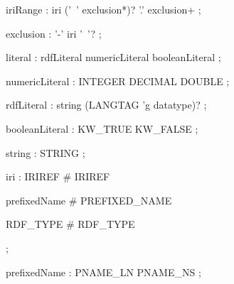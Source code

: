 \documentclass{article}
\def\bnf#1{{\scriptsize {{#1}} }}
\begin{document}
\begin{framed}
\noindent
\bnf{iriRange        : iri ('~' exclusion*)?  \textbar  '.' exclusion+ ;}
\end{framed}


\begin{framed}
\noindent
\bnf{exclusion       : '-' iri '~'? ;}
\end{framed}


\begin{framed}
\noindent
\bnf{literal         : rdfLiteral \textbar  numericLiteral \textbar  booleanLiteral ;}
\end{framed}


\begin{framed}
\noindent
\bnf{numericLiteral  : INTEGER \textbar  DECIMAL \textbar  DOUBLE ;}
\end{framed}


\begin{framed}
\noindent
\bnf{rdfLiteral      : string (LANGTAG \textbar  '^^' datatype)? ;}
\end{framed}


\begin{framed}
\noindent
\bnf{booleanLiteral  : KW\_TRUE \textbar  KW\_FALSE ;}
\end{framed}


\begin{framed}
\noindent
\bnf{string          : STRING ;}
\end{framed}


\begin{framed}
\noindent
\bnf{iri             : IRIREF            \# IRIREF}
\end{framed}


\begin{framed}
\noindent
\bnf{                \textbar  prefixedName        \# PREFIXED\_NAME}
\end{framed}


\begin{framed}
\noindent
\bnf{                \textbar  RDF\_TYPE            \# RDF\_TYPE}
\end{framed}


\begin{framed}
\noindent
\bnf{                ;}
\end{framed}


\begin{framed}
\noindent
\bnf{prefixedName    : PNAME\_LN \textbar  PNAME\_NS ;}
\end{framed}
\end{document}
